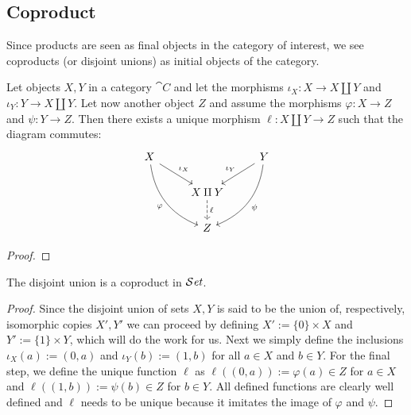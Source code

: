 \subsection{Coproduct}

Since products are seen as final objects in the category of interest, we see
coproducts (or disjoint unions) as initial objects of the category.

\begin{proposition}
   Let objects \(X, Y\) in a category \(\cat C\) and let the morphisms
   \(\iota_X : X \to X \amalg Y\) and \(\iota_Y : Y \to X \amalg Y\). Let now
   another object \(Z\) and assume the morphisms \(\varphi : X \to Z\) and
   \(\psi : Y \to Z\). Then there exists a unique morphism \(\ell : X \amalg Y
   \to Z\) such that the diagram commutes:
    \[
      \begin{tikzcd}
        X
        \ar[ddr, bend right, swap,  "\varphi"]
        \ar[dr, "\iota_X"]
          &
            &Y
            \ar[dl, swap, "\iota_Y"]
            \ar[ddl, bend left, "\psi"]
            \\
          &X \amalg Y
          \ar[d, dashed, "\ell"]
            &\\
          &Z
      \end{tikzcd}
   \]
\end{proposition}

\begin{proof}
\end{proof}

\begin{proposition}
   The disjoint union is a coproduct in \({\mathcal{S}\textit{et}}\).
\end{proposition}

\begin{proof}
    Since the disjoint union of sets \(X, Y\) is said to be the union of,
    respectively, isomorphic copies \(X', Y'\) we can proceed by defining  \(X'
    := \{0\} \times X\) and \(Y' := \{1\} \times Y\), which will do the work
    for us. Next we simply define the inclusions \(\iota_X(a) := (0, a)\) and
    \(\iota_Y(b) := (1, b)\) for all \(a \in X\) and \(b \in Y\). For the final
    step, we define the unique function \(\ell\) as \(\ell((0,a)) := \varphi(a)
    \in Z\) for \(a \in X\) and \(\ell((1, b)) := \psi(b) \in Z\)  for \(b \in
    Y\). All defined functions are clearly well defined and \(\ell\) needs to be
    unique because it imitates the image of \(\varphi\) and \(\psi\).
\end{proof}

